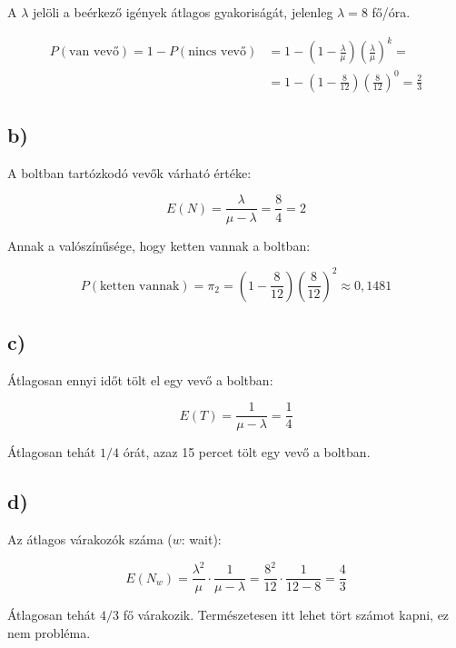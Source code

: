 \documentclass[a4paper,12pt]{article}   		%
\begin{document}
A $\lambda$ jelöli a beérkező igények átlagos gyakoriságát, jelenleg
$\lambda = 8$ fő/óra.

\[
\begin{split}
P(\text{van vevő}) = 1 - P(\text{nincs vevő}) &= 
1 - \left( 1 - \frac{\lambda}{\mu} \right) 
\left( \frac{\lambda}{\mu} \right)^k = \\
&=1 - \left( 1 - \frac{8}{12} \right) 
\left( \frac{8}{12} \right)^0 = \frac{2}{3}
\end{split}
\]

\subsection*{b)}
A boltban tartózkodó vevők várható értéke:

\[
E(N) = \frac{\lambda}{\mu - \lambda} = \frac{8}{4} = 2
\]

Annak a valószínűsége, hogy ketten vannak a boltban: 

\[
P(\text{ketten vannak}) = \pi_2 = 
\left( 1 - \frac{8}{12} \right) 
\left( \frac{8}{12} \right)^2 \approx 0,1481
\]

\subsection*{c)}
Átlagosan ennyi időt tölt el egy vevő a boltban:

\[
E(T) = \frac{1}{\mu - \lambda} = \frac{1}{4}
\]

Átlagosan tehát $1/4$ órát, azaz 15 percet tölt egy vevő a boltban.

\subsection*{d)}
Az átlagos várakozók száma ($w$: wait):

\[
E(N_w) = \frac{\lambda^2}{\mu} \cdot \frac{1}{\mu - \lambda} =
\frac{8^2}{12} \cdot \frac{1}{12 - 8} = \frac{4}{3}
\]

Átlagosan tehát $4/3$ fő várakozik. Természetesen itt lehet tört
számot kapni, ez nem probléma.
\end{document}

